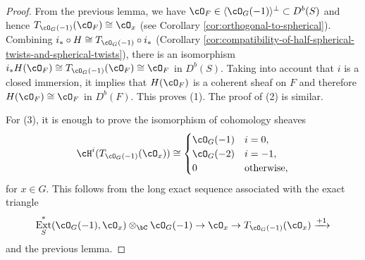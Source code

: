 \documentclass{amsart}
\numberwithin{equation}{section}
\theoremstyle{plain}
\theoremstyle{definition}
\DeclareMathOperator{\Ext}{\mathrm{Ext}}
\begin{document}
\begin{proof}
    From the previous lemma, we have $\cO_F \in \langle \cO_G(-1) \rangle^\perp \subset D^b(S)$ and hence $T_{\cO_G(-1)}(\cO_F) \cong \cO_x$ (see Corollary \ref{cor:orthogonal-to-spherical}).
    Combining $i_* \circ H \cong T_{\cO_G(-1)} \circ i_*$ (Corollary \ref{cor:compatibility-of-half-spherical-twists-and-spherical-twists}), there is an isomorphism $i_*H(\cO_F) \cong T_{\cO_G(-1)}(\cO_F) \cong \cO_F$ in $D^b(S)$.
    Taking into account that $i$ is a closed immersion, it implies that $H(\cO_F)$ is a coherent sheaf on $F$ and therefore $H(\cO_F) \cong \cO_F$ in $D^b(F)$.
    This proves (1).
    The proof of (2) is similar.

    For (3), it is enough to prove the isomorphism of cohomology sheaves
    \begin{equation}
        \cH^i(T_{\cO_G(-1)}(\cO_x)) \cong \begin{cases}
            \cO_G(-1) & i = 0,            \\
            \cO_G(-2) & i = -1,           \\
            0         & \text{otherwise},
        \end{cases}
    \end{equation}
    for $x \in G$.
    This follows from the long exact sequence associated with the exact triangle
    \begin{equation}
        \Ext^*_S(\cO_G(-1), \cO_x) \otimes_\bC \cO_G(-1)\to \cO_x \to T_{\cO_G(-1)}(\cO_x) \xrightarrow{+1}
    \end{equation}
    and the previous lemma.
\end{proof}
\end{document}

